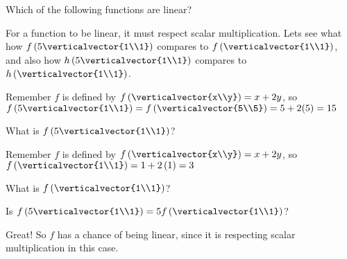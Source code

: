 \documentclass{ximera}
\begin{document}
\begin{question}
  Which of the following functions are linear?
  \begin{solution}
    \begin{hint}
    	For a function to be linear, it must respect scalar multiplication.  Lets see what how $f\left(5 \verticalvector{1\\1}\right)$ compares to $f\left(\verticalvector{1\\1}\right)$, and also how
        $h\left(5 \verticalvector{1\\1}\right)$ compares to $h\left(\verticalvector{1\\1}\right)$.  
	
        \begin{question}
        	\begin{solution}
		\begin{hint}
			Remember $f$ is defined by $f\left( \verticalvector{x\\y}\right) =x+2y$, so
			$f\left(5 \verticalvector{1\\1}\right) = f\left(\verticalvector{5\\5}\right) = 5+2(5) = 15$
		\end{hint}
        	 What is $f\left(5 \verticalvector{1\\1}\right)$?
        	\end{solution}
        	\begin{solution}
		\begin{hint}
			Remember $f$ is defined by $f\left( \verticalvector{x\\y}\right) =x+2y$, so
			$f\left(\verticalvector{1\\1}\right) = 1+2\left(1\right) = 3$
		\end{hint}
        	 What is $f\left(\verticalvector{1\\1}\right)$?
        	 \answer{3}
        	\end{solution}
        	\begin{solution}
        		Is $f\left(5 \verticalvector{1\\1}\right) = 5 f\left(\verticalvector{1\\1}\right)$?
        		\begin{multiple-choice}
        		\choice[correct]{Yes}
        		\choice{No}
        		\end{multiple-choice}
        	\end{solution}
        	Great!  So $f$ has a chance of being linear, since it is respecting scalar multiplication in this case.

\end{question}
\end{hint}
\end{solution}
\end{question}
\end{document}
